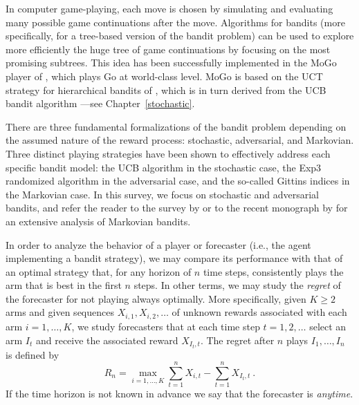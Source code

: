 \documentclass[11pt]{hackednow}
\begin{document}
In computer game-playing, each move is chosen by simulating and evaluating many possible game continuations after the move. Algorithms for bandits (more specifically, for a tree-based version of the bandit problem) can be used to explore more efficiently the huge tree of game continuations by focusing on the most promising subtrees. This idea has been successfully implemented in the MoGo player of \cite{GWMT06}, which plays Go at world-class level. MoGo is based on the UCT strategy for hierarchical bandits of \cite{KS06}, which is in turn derived from the UCB bandit algorithm ---see Chapter~\ref{stochastic}.

%
There are three fundamental formalizations of the bandit problem depending on the assumed nature of the reward process: stochastic, adversarial, and Markovian. Three distinct playing strategies have been shown to effectively address each specific bandit model: the UCB algorithm in the stochastic case, the Exp3 randomized algorithm in the adversarial case, and the so-called Gittins indices in the Markovian case. In this survey, we focus on stochastic and adversarial bandits, and refer the reader to the survey by \cite{mahajan2008multi} or to the recent monograph by \cite{GGW11} for an extensive analysis of Markovian bandits.

In order to analyze the behavior of a player or forecaster (i.e., the agent implementing a bandit strategy), we may compare its performance with that of an optimal strategy that, for any horizon of $n$ time steps, consistently plays the arm that is best in the first $n$ steps. In other terms, we may study the \textsl{regret} of the forecaster for not playing always optimally. More specifically, given $K \ge 2$ arms and given sequences $X_{i,1},X_{i,2},\dots$ of unknown rewards associated with each arm $i=1,\dots,K$, we study forecasters that at each time step $t=1,2,\dots$ select an arm $I_t$ and receive the associated reward $X_{I_t,t}$. The regret after $n$ plays $I_1,\dots,I_n$ is defined by
\begin{equation} \label{eq:regret}
    R_n = \max_{i=1,\hdots,K} \sum_{t=1}^n X_{i,t} - \sum_{t=1}^n X_{I_t,t}~.
\end{equation}
If the time horizon is not known in advance we say that the forecaster is {\em anytime}.
\end{document}
